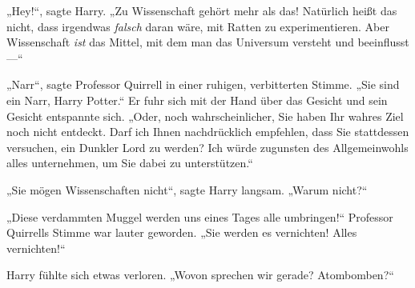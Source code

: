 „Hey!“, sagte Harry. „Zu Wissenschaft gehört mehr als das! Natürlich heißt das nicht, dass irgendwas \emph{falsch} daran wäre, mit Ratten zu experimentieren. Aber Wissenschaft \emph{ist} das Mittel, mit dem man das Universum versteht und beeinflusst—“

„Narr“, sagte Professor Quirrell in einer ruhigen, verbitterten Stimme. „Sie sind ein Narr, Harry Potter.“ Er fuhr sich mit der Hand über das Gesicht und sein Gesicht entspannte sich. „Oder, noch wahrscheinlicher, Sie haben Ihr wahres Ziel noch nicht entdeckt. Darf ich Ihnen nachdrücklich empfehlen, dass Sie stattdessen versuchen, ein Dunkler Lord zu werden? Ich würde zugunsten des Allgemeinwohls alles unternehmen, um Sie dabei zu unterstützen.“

„Sie mögen Wissenschaften nicht“, sagte Harry langsam. „Warum nicht?“

„Diese verdammten Muggel werden uns eines Tages alle umbringen!“ Professor Quirrells Stimme war lauter geworden. „Sie werden es vernichten! Alles vernichten!“

Harry fühlte sich etwas verloren. „Wovon sprechen wir gerade? Atombomben?“

